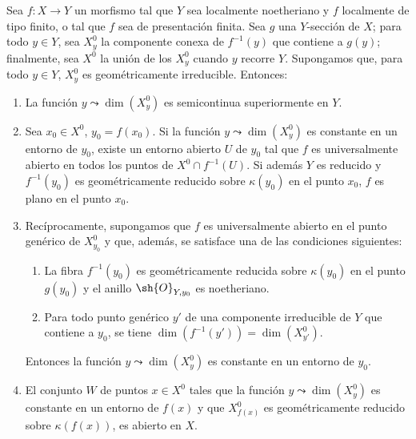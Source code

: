 \begin{proposition}[15.6.6]
\label{IV.15.6.6}
Sea $f:X\to Y$ un morfismo tal que $Y$ sea localmente noetheriano y $f$ localmente de tipo finito, \textup{o} tal que $f$ sea de presentación finita.
Sea $g$ una $Y$-sección de $X$; para todo $y\in Y$, sea $X_y^0$ la componente conexa de $f^{-1}(y)$ que contiene a $g(y)$; finalmente, sea $X^0$ la unión de los $X_y^0$ cuando $y$ recorre $Y$.
Supongamos que, para todo $y\in Y$, $X_y^0$ es geométricamente irreducible.
Entonces:
\begin{enumerate}[label=(\roman*)]
  \item La función $y\leadsto\dim(X_y^0)$ es semicontinua superiormente en $Y$.
  \item Sea $x_0\in X^0$, $y_0=f(x_0)$.
Si la función $y\leadsto\dim(X_y^0)$ es constante en un entorno de $y_0$, existe un entorno abierto $U$ de $y_0$ tal que $f$ es universalmente abierto en todos los puntos de $X^0\cap f^{-1}(U)$.
Si además $Y$ es reducido y $f^{-1}(y_0)$ es geométricamente reducido sobre $\kappa(y_0)$ en el punto $x_0$, $f$ es plano en el punto $x_0$.
  \item Recíprocamente, supongamos que $f$ es universalmente abierto en el punto genérico de $X_{y_0}^0$ y que, además, se satisface \textup{una} de las condiciones siguientes:
  \begin{enumerate}
    \item[$\alpha$)] La fibra $f^{-1}(y_0)$ es geométricamente reducida sobre $\kappa(y_0)$ en el punto $g(y_0)$ y el anillo $\sh{O}_{Y,y_0}$ es noetheriano.
    \item[$\beta$)] Para todo punto genérico $y'$ de una componente irreducible de $Y$ que contiene a $y_0$, se tiene $\dim(f^{-1}(y'))=\dim(X_{y'}^0)$.
  \end{enumerate}
Entonces la función $y\leadsto\dim(X_y^0)$ es constante en un entorno de $y_0$.
  \item El conjunto $W$ de puntos $x\in X^0$ tales que la función $y\leadsto\dim(X_y^0)$ es constante en un entorno de $f(x)$ y que $X_{f(x)}^0$ es geométricamente reducido sobre $\kappa(f(x))$, es abierto en $X$.
\end{enumerate}
\end{proposition}

